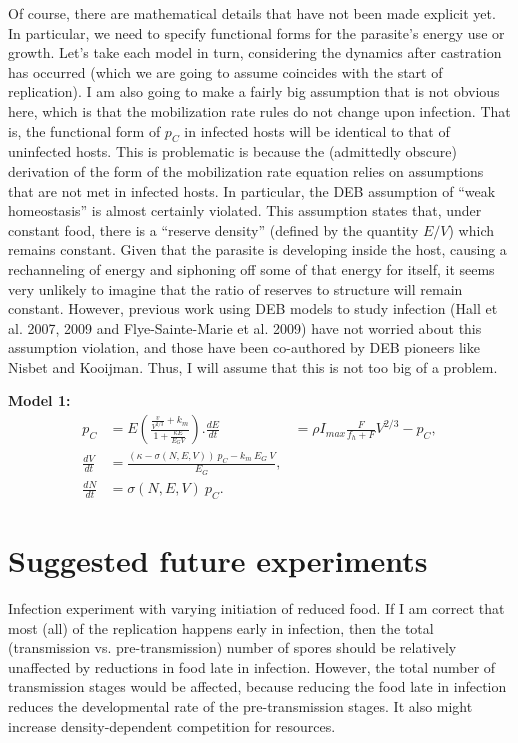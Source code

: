 \documentclass[11pt,reqno,final,pdftex]{amsart}\usepackage[]{graphicx}\usepackage[]{color}
\theoremstyle{plain}
\numberwithin{equation}{part}
\begin{document}
Of course, there are mathematical details that have not been made explicit yet.
In particular, we need to specify functional forms for the parasite's energy use or growth.
Let's take each model in turn, considering the dynamics after castration has occurred (which we are going to assume coincides with the start of replication).
I am also going to make a fairly big assumption that is not obvious here, which is that the mobilization rate rules do not change upon infection.
That is, the functional form of $p_C$ in infected hosts will be identical to that of uninfected hosts.
This is problematic is because the (admittedly obscure) derivation of the form of the mobilization rate equation relies on assumptions that are not met in infected hosts.
In particular, the DEB assumption of ``weak homeostasis'' is almost certainly violated.
This assumption states that, under constant food, there is a ``reserve density'' (defined by the quantity $E/V$) which remains constant.
Given that the parasite is developing inside the host, causing a rechanneling of energy and siphoning off some of that energy for itself, it seems very unlikely to imagine that the ratio of reserves to structure will remain constant.
However, previous work using DEB models to study infection (Hall et al. 2007, 2009 and Flye-Sainte-Marie et al. 2009) have not worried about this assumption violation, and those have been co-authored by DEB pioneers like Nisbet and Kooijman.
Thus, I will assume that this is not too big of a problem.

\textbf{Model 1:}
\begin{align}
p_C &= E \left(\frac{\frac{v}{V^{2/3}} + k_m}{1+\frac{\kappa E}{E_G V}}\right).
\frac{dE}{dt} &= \rho I_{max} \frac{F}{f_h+F} V^{2/3} - p_C, \\
\frac{dV}{dt} &= \frac{(\kappa-\sigma(N,E,V))~p_C - k_m~E_G~V}{E_G}, \\
\frac{dN}{dt} &= \sigma(N,E,V)~p_C.
\end{align}



\section*{Suggested future experiments}
Infection experiment with varying initiation of reduced food.
If I am correct that most (all) of the replication happens early in infection, then the total (transmission vs. pre-transmission) number of spores should be relatively unaffected by reductions in food late in infection.
However, the total number of transmission stages would be affected, because reducing the food late in infection reduces the developmental rate of the pre-transmission stages.
It also might increase density-dependent competition for resources.
\end{document}

